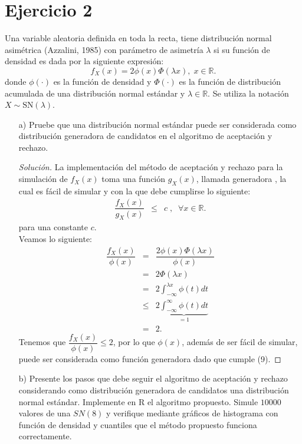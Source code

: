 \documentclass[11pt]{article}
\renewcommand{\=}[1]{\stackrel{#1}{=}} %
\newenvironment{sol}
{\begin{proof}[Solución]}
	{\end{proof}}
\theoremstyle{definition}
\theoremstyle{remark}
\begin{document}
\section*{Ejercicio 2}
Una variable aleatoria definida en toda la recta, tiene distribución normal asimétrica (Azzalini, 1985)
con parámetro de asimetría $\lambda$ si su función de densidad es dada por la siguiente expresión:
$$f_X(x)=2\phi(x)\Phi(\lambda x),\;x\in\mathbb{R}.$$
donde $\phi(\cdot)$ es la 
función de densidad y $\Phi(\cdot)$ es la función de distribución acumulada de una distribución normal estándar y $\lambda\in\mathbb{R}$. Se utiliza la notación $X\sim \text{SN}(\lambda)$.
\begin{itemize}
	\item[a)] Pruebe que una distribución normal estándar puede ser considerada como distribución generadora
	de candidatos en el algoritmo de aceptación y rechazo.
	\begin{sol}
		La implementación del método de aceptación y rechazo para la simulación de $f_X(x)$ toma una función $g_X(x)$, llamada generadora , la cual es fácil de simular y con la que debe cumplirse lo siguiente:
		\begin{eqnarray}
		\dfrac{f_X(x)}{g_X(x)}&\leq &c \;,\;\;\forall x\in\mathbb{R}.
		\end{eqnarray}
		para una constante $c$.\\
		Veamos lo siguiente:
		\begin{eqnarray}
		\dfrac{f_X(x)}{\phi(x)} &=& \dfrac{2\phi(x)\Phi(\lambda x)}{\phi(x)}\nonumber\\
		&=& 2\Phi(\lambda x)\nonumber\\
		&=& 2\int_{-\infty}^{\lambda x}\phi(t)dt\nonumber\\
		&\leq& 2\underbrace{\int_{-\infty}^{\infty}\phi(t)dt}_{=1}\nonumber\\
		&=&2.
		\end{eqnarray}
		Tenemos que $\dfrac{f_X(x)}{\phi(x)}\leq 2$, por lo que $\phi(x)$, además de ser fácil de simular, puede ser considerada como función generadora dado que cumple (9).
	\end{sol}
\newpage
	\item[b)] Presente los pasos que debe seguir el algoritmo de aceptación y rechazo considerando como distribución generadora de candidatos una distribución normal estándar. Implemente en R el algoritmo
	propuesto. Simule $10000$ valores de una $SN(8)$ y 
	verifique mediante gráficos de histograma con
	función de densidad y cuantiles que el método propuesto funciona correctamente.

\end{itemize}
\end{document}
